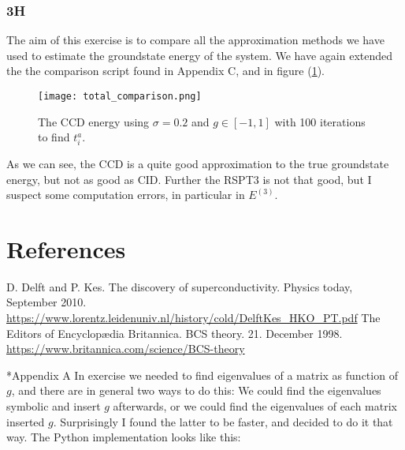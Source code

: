 \documentclass[norsk,a4paper,12pt]{article}
\begin{document}
\subsubsection*{3H}
The aim of this exercise is to compare all the approximation methods we have used to estimate the groundstate energy of the system. We have again extended the the comparison script found in Appendix C, and in figure (\ref{fig:total_comparison}).
\begin{figure}[H]
\centering
\texttt{[image: total\_comparison.png]}
\caption{The CCD energy using $\sigma=0.2$ and $g\in[-1,1]$ with 100 iterations to find $t_i^a$. \label{fig:total_comparison}}
\end{figure}
As we can see, the CCD is a quite good approximation to the true groundstate energy, but not as good as CID. Further the RSPT3 is not that good, but I suspect some computation errors, in particular in $E^{(3)}$.

\section{References}
\begingroup
\renewcommand{\section}[2]{}
\begin{thebibliography}{}
  D. Delft and P. Kes. 
  The discovery of superconductivity. 
  Physics today, September 2010. 
  \url{https://www.lorentz.leidenuniv.nl/history/cold/DelftKes_HKO_PT.pdf}
  The Editors of Encyclopædia Britannica. 
  BCS theory. 
  21. December 1998. 
  \url{https://www.britannica.com/science/BCS-theory}
\end{thebibliography}
\endgroup

\newpage
\section{Appendices}
\subsection*{Appendix A}
In exercise we needed to find eigenvalues of a matrix as function of $g$, and there are in general two ways to do this: We could find the eigenvalues symbolic and insert $g$ afterwards, or we could find the eigenvalues of each matrix inserted $g$. Surprisingly I found the latter to be faster, and decided to do it that way. The Python implementation looks like this:

\end{document}
